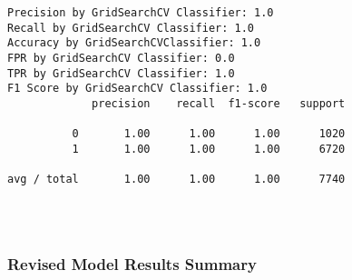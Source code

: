 \documentclass[11pt]{article}
\begin{document}
    \begin{Verbatim}[commandchars=\\\{\}]
Precision by GridSearchCV Classifier: 1.0
Recall by GridSearchCV Classifier: 1.0
Accuracy by GridSearchCVClassifier: 1.0
FPR by GridSearchCV Classifier: 0.0
TPR by GridSearchCV Classifier: 1.0
F1 Score by GridSearchCV Classifier: 1.0
             precision    recall  f1-score   support

          0       1.00      1.00      1.00      1020
          1       1.00      1.00      1.00      6720

avg / total       1.00      1.00      1.00      7740


    \end{Verbatim}

    \begin{center}
    \end{center}
    { \hspace*{\fill} \\}
    
    \subsubsection{Revised Model Results
Summary}\label{revised-model-results-summary}
\end{document}
